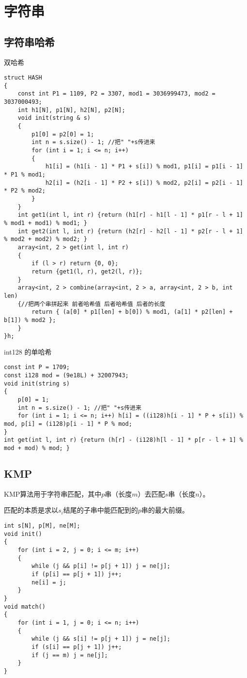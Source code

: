 \documentclass[a4paper, fontset=none]{ctexart}
\begin{document}
\section{字符串}
\subsection{字符串哈希}
双哈希
\begin{verbatim}
struct HASH
{
    const int P1 = 1109, P2 = 3307, mod1 = 3036999473, mod2 = 3037000493;
    int h1[N], p1[N], h2[N], p2[N];
    void init(string & s)
    {
        p1[0] = p2[0] = 1;
        int n = s.size() - 1; //把" "+s传进来
        for (int i = 1; i <= n; i++)
        {
            h1[i] = (h1[i - 1] * P1 + s[i]) % mod1, p1[i] = p1[i - 1] * P1 % mod1;
            h2[i] = (h2[i - 1] * P2 + s[i]) % mod2, p2[i] = p2[i - 1] * P2 % mod2;
        }
    }
    int get1(int l, int r) {return (h1[r] - h1[l - 1] * p1[r - l + 1] % mod1 + mod1) % mod1; }
    int get2(int l, int r) {return (h2[r] - h2[l - 1] * p2[r - l + 1] % mod2 + mod2) % mod2; }
    array<int, 2 > get(int l, int r)
    {
        if (l > r) return {0, 0};
        return {get1(l, r), get2(l, r)};
    }
    array<int, 2 > combine(array<int, 2 > a, array<int, 2 > b, int len)
    {//把两个串拼起来 前者哈希值 后者哈希值 后者的长度
        return { (a[0] * p1[len] + b[0]) % mod1, (a[1] * p2[len] + b[1]) % mod2 };
    }
}h;
\end{verbatim}

int128 的单哈希

\begin{verbatim}
const int P = 1709;
const i128 mod = (9e18L) + 32007943;
void init(string s)
{
    p[0] = 1;
    int n = s.size() - 1; //把" "+s传进来
    for (int i = 1; i <= n; i++) h[i] = ((i128)h[i - 1] * P + s[i]) % mod, p[i] = (i128)p[i - 1] * P % mod;
}
int get(int l, int r) {return (h[r] - (i128)h[l - 1] * p[r - l + 1] % mod + mod) % mod; }
\end{verbatim}
\subsection{KMP}

KMP算法用于字符串匹配，其中$p$串（长度$m$）去匹配$s$串（长度$n$）。

匹配的本质是求以$s_i$结尾的子串中能匹配到的$p$串的最大前缀。

\begin{verbatim}
int s[N], p[M], ne[M];
void init()
{
    for (int i = 2, j = 0; i <= m; i++)
    {
        while (j && p[i] != p[j + 1]) j = ne[j];
        if (p[i] == p[j + 1]) j++;
        ne[i] = j;
    }
}
void match()
{
    for (int i = 1, j = 0; i <= n; i++)
    {
        while (j && s[i] != p[j + 1]) j = ne[j];
        if (s[i] == p[j + 1]) j++;
        if (j == m) j = ne[j];
    }
}
\end{verbatim}
\end{document}
